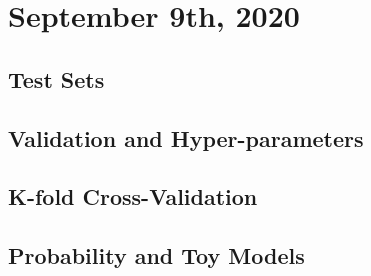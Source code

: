 \documentclass[11pt]{scrartcl}
\begin{document}
\section{September 9th, 2020}
\subsection{Test Sets}
\subsection{Validation and Hyper-parameters}
\subsection{K-fold Cross-Validation}
\subsection{Probability and Toy Models}
\end{document}
